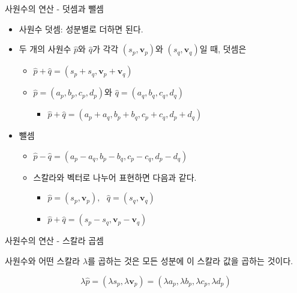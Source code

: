 \begin{frame}[fragile]{사원수의 연산 - 덧셈과 뺄셈}

\begin{itemize}
\item 사원수 덧셈: 성분별로 더하면 된다.
\item 두 개의 사원수 $\hat{p}$와 $\hat{q}$가 각각 $(s_p, \mathbf v_p)$와 $(s_q, \mathbf v_q)$일 때, 덧셈은
	\begin{itemize}
	\item $\hat{p} + \hat{q} = (s_p + s_q , \mathbf v_p + \mathbf v_q )$
	\item $\hat{p} = (a_p, b_p, c_p, d_p)$와 $\hat{q} = (a_q, b_q, c_q, d_q)$
		\begin{itemize}
		\item $\hat{p} + \hat{q} = (a_p + a_q, b_p + b_q , c_p + c_q , d_p + d_q)$
		\end{itemize}
	\end{itemize}
\end{itemize}

\begin{itemize}
\item 뺄셈
	\begin{itemize}
	\item $\hat{p} - \hat{q} = (a_p - a_q, b_p - b_q , c_p - c_q , d_p - d_q)$
	\item 스칼라와 벡터로 나누어 표현하면 다음과 같다.
		\begin{itemize}
		\item $\hat{p} = (s_p, \mathbf v_p),~~~ \hat{q} = (s_q, \mathbf v_q)$
		\item $\hat{p} + \hat{q} = (s_p - s_q , \mathbf v_p - \mathbf v_q )$
		\end{itemize}
	\end{itemize}
\end{itemize}

\end{frame}



\begin{frame}[fragile]{사원수의 연산 - 스칼라 곱셈}

사원수와 어떤 스칼라 $\lambda$를 곱하는 것은 모든 성분에 이 스칼라 값을 곱하는 것이다.

$$\lambda \hat{p} = (\lambda s_p , \lambda \mathbf v_p) = (\lambda a_p, \lambda b_p, \lambda c_p, \lambda d_p)$$




\end{frame}

